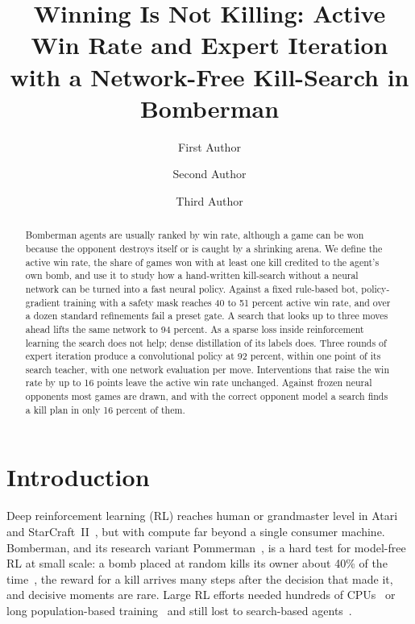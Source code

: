 \documentclass[runningheads]{llncs}
\begin{document}
\title{Winning Is Not Killing: Active Win Rate and Expert Iteration with a Network-Free Kill-Search in Bomberman}

\author{First Author \and Second Author \and Third Author}

\maketitle

\begin{abstract}
Bomberman agents are usually ranked by win rate, although a game can be won because the opponent destroys itself or is caught by a shrinking arena. We define the active win rate, the share of games won with at least one kill credited to the agent's own bomb, and use it to study how a hand-written kill-search without a neural network can be turned into a fast neural policy. Against a fixed rule-based bot, policy-gradient training with a safety mask reaches 40 to 51 percent active win rate, and over a dozen standard refinements fail a preset gate. A search that looks up to three moves ahead lifts the same network to 94 percent. As a sparse loss inside reinforcement learning the search does not help; dense distillation of its labels does. Three rounds of expert iteration produce a convolutional policy at 92 percent, within one point of its search teacher, with one network evaluation per move. Interventions that raise the win rate by up to 16 points leave the active win rate unchanged. Against frozen neural opponents most games are drawn, and with the correct opponent model a search finds a kill plan in only 16 percent of them.
\end{abstract}


\section{Introduction}

Deep reinforcement learning (RL) reaches human or grandmaster level in Atari and StarCraft~II~\cite{mnih2015dqn,vinyals2019alphastar}, but with compute far beyond a single consumer machine. Bomberman, and its research variant Pommerman~\cite{resnick2018pommerman}, is a hard test for model-free RL at small scale: a bomb placed at random kills its owner about 40\% of the time~\cite{gao2019hard}, the reward for a kill arrives many steps after the decision that made it, and decisive moments are rare. Large RL efforts needed hundreds of CPUs~\cite{peng2018continual} or long population-based training~\cite{huynh2024} and still lost to search-based agents~\cite{osogami2019,huynh2024}.
\end{document}
